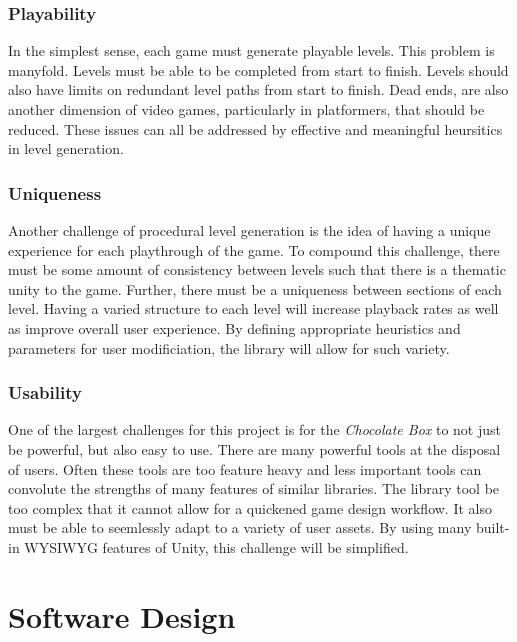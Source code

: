 \documentclass[pdftex,12pt,letter]{article}
\begin{document}
\subsubsection{Playability}
In the simplest sense, each game must generate playable levels. This problem is manyfold. Levels must be able to be completed from start to finish. Levels should also have limits on redundant level paths from start to finish. Dead ends, are also another dimension of video games, particularly in platformers, that should be reduced. These issues can all be addressed by effective and meaningful heursitics in level generation.
\subsubsection{Uniqueness}
Another challenge of procedural level generation is the idea of having a unique experience for each playthrough of the game. To compound this challenge, there must be some amount of consistency between levels such that there is a thematic unity to the game. Further, there must be a uniqueness between sections of each level. Having a varied structure to each level will increase playback rates as well as improve overall user experience. By defining appropriate heuristics and parameters for user modificiation, the library will allow for such variety. 
\subsubsection{Usability}
One of the largest challenges for this project is for the \textit{Chocolate Box} to not just be powerful, but also easy to use. There are many powerful tools at the disposal of users. Often these tools are too feature heavy and less important tools can convolute the strengths of many features of similar libraries. The library tool be too complex that it cannot allow for a quickened game design workflow. It also must be able to seemlessly adapt to a variety of user assets. By using many built-in WYSIWYG features of Unity, this challenge will be simplified. 


\section{Software Design}
\end{document}
